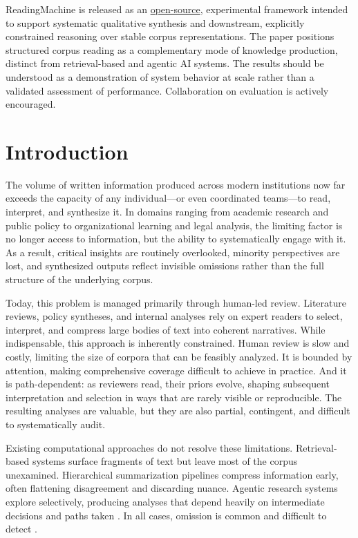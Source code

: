\documentclass[
  11pt,
]{article}
\begin{document}
ReadingMachine is released as an \href{https://github.com/morrisseyj/ReadingMachine/tree/main}
{open-source}, experimental framework intended to 
support systematic qualitative synthesis and downstream, explicitly constrained 
reasoning over stable corpus representations. The paper positions structured corpus 
reading as a complementary mode of knowledge production, distinct from retrieval-based 
and agentic AI systems. The results should be understood as a demonstration of system 
behavior at scale rather than a validated assessment of performance. Collaboration 
on evaluation is actively encouraged.

\section{Introduction}\label{introduction}

The volume of written information produced across modern institutions
now far exceeds the capacity of any individual---or even coordinated
teams---to read, interpret, and synthesize it. In domains ranging from
academic research and public policy to organizational learning and legal
analysis, the limiting factor is no longer access to information, but
the ability to systematically engage with it. As a result, critical
insights are routinely overlooked, minority perspectives are lost, and
synthesized outputs reflect invisible omissions rather than the full
structure of the underlying corpus.

Today, this problem is managed primarily through human-led review.
Literature reviews, policy syntheses, and internal analyses rely on
expert readers to select, interpret, and compress large bodies of text
into coherent narratives. While indispensable, this approach is
inherently constrained. Human review is slow and costly, limiting the
size of corpora that can be feasibly analyzed. It is bounded by
attention, making comprehensive coverage difficult to achieve in
practice. And it is path-dependent: as reviewers read, their priors
evolve, shaping subsequent interpretation and selection in ways that are
rarely visible or reproducible. The resulting analyses are valuable, but
they are also partial, contingent, and difficult to systematically
audit.

Existing computational approaches do not resolve these limitations.
Retrieval-based systems surface fragments of text but leave most of the
corpus unexamined. Hierarchical summarization pipelines compress
information early, often flattening disagreement and discarding nuance.
Agentic research systems explore selectively, producing analyses that
depend heavily on intermediate decisions and paths taken \cite{he2025}. 
In all cases, omission is common and difficult to detect
\cite{laban2024,liu2024}.
\end{document}
